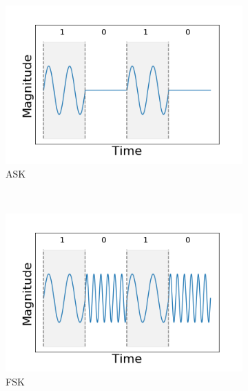 \documentclass[]{article}
\begin{document}
\begin{figure}[h!]
	\centering
	\begin{subfigure}[b]{0.3\textwidth}
		\includegraphics[width=\textwidth]{figs/shift_keying/amplitude_shift_keying.png}
		\caption{ASK}
		\label{fig:am_message_signal}
	\end{subfigure}
	~ %
	\begin{subfigure}[b]{0.3\textwidth}
		\includegraphics[width=\textwidth]{figs/shift_keying/frequency_shift_keying.png}
		\caption{FSK}
		\label{fig:am_carrier_signal}
	\end{subfigure}
	~ %
	\begin{subfigure}[b]{0.3\textwidth}

\end{subfigure}
\end{figure}
\end{document}
